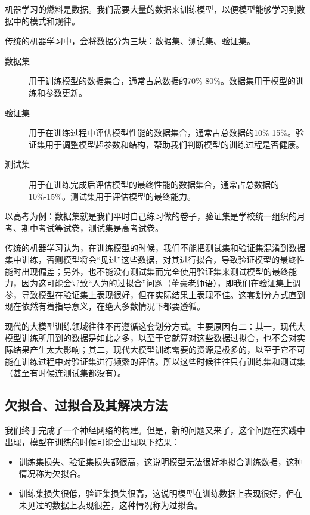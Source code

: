 机器学习的燃料是数据。我们需要大量的数据来训练模型，以便模型能够学习到数据中的模式和规律。

传统的机器学习中，会将数据分为三块：数据集、测试集、验证集。
\begin{description}
    \item[数据集] 用于训练模型的数据集合，通常占总数据的70\%-80\%。数据集用于模型的训练和参数更新。
    \item[验证集] 用于在训练过程中评估模型性能的数据集合，通常占总数据的10\%-15\%。验证集用于调整模型超参数和结构，帮助我们判断模型的训练过程是否健康。
    \item[测试集] 用于在训练完成后评估模型的最终性能的数据集合，通常占总数据的10\%-15\%。测试集用于评估模型的最终能力。
\end{description}
以高考为例：数据集就是我们平时自己练习做的卷子，验证集是学校统一组织的月考、期中考试等试卷，测试集是高考试卷。

传统的机器学习认为，在训练模型的时候，我们不能把测试集和验证集混淆到数据集中训练，否则模型将会“见过”这些数据，对其进行拟合，导致验证模型的最终性能时出现偏差；另外，也不能没有测试集而完全使用验证集来测试模型的最终能力，因为这可能会导致“人为的过拟合”问题（董豪老师语），即我们在验证集上调参，导致模型在验证集上表现很好，但在实际结果上表现不佳。这套划分方式直到现在依然有着指导意义，在绝大多数情况下都要遵循。

\begin{framed}{}
现代的大模型训练领域往往不再遵循这套划分方式。主要原因有二：其一，现代大模型训练所用到的数据是如此之多，以至于它就算对这些数据过拟合，也不会对实际结果产生太大影响；其二，现代大模型训练需要的资源是极多的，以至于它不可能在训练过程中对验证集进行频繁的评估。所以这些时候往往只有训练集和测试集（甚至有时候连测试集都没有）。
\end{framed}

\subsection{欠拟合、过拟合及其解决方法}

我们终于完成了一个神经网络的构建。但是，新的问题又来了，这个问题在实践中出现，模型在训练的时候可能会出现以下结果：
\begin{itemize}
    \item 训练集损失、验证集损失都很高，这说明模型无法很好地拟合训练数据，这种情况称为欠拟合。
    \item 训练集损失很低，验证集损失很高，这说明模型在训练数据上表现很好，但在未见过的数据上表现很差，这种情况称为过拟合。
\end{itemize}

